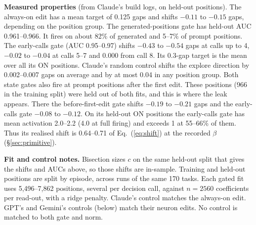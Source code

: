 \textbf{Measured properties} (from Claude's build logs, on held-out positions). The always-on edit has a mean target of 0.125 gaps and shifts $-0.11$ to $-0.15$ gaps, depending on the position group. The generated-positions gate has held-out AUC 0.961--0.966. It fires on about 82\% of generated and 5--7\% of prompt positions. The early-calls gate (AUC 0.95--0.97) shifts $-0.43$ to $-0.54$ gaps at calls up to 4, $-0.02$ to $-0.04$ at calls 5--7 and 0.000 from call 8. Its 0.3-gap target is the mean over all its ON positions. Claude's random control shifts the explore direction by 0.002--0.007 gaps on average and by at most 0.04 in any position group. Both state gates also fire at prompt positions after the first edit. These positions (966 in the training split) were held out of both fits, and this is where the leak appears. There the before-first-edit gate shifts $-0.19$ to $-0.21$ gaps and the early-calls gate $-0.08$ to $-0.12$. On its held-out ON positions the early-calls gate has mean activation 2.0--2.2 (4.0 at full firing) and exceeds 1 at 55--66\% of them. Thus its realised shift is 0.64--0.71 of Eq.~(\ref{eq:shift}) at the recorded $\beta$ (\S\ref{sec:primitive}).

\textbf{Fit and control notes.} Bisection sizes $c$ on the same held-out split that gives the shifts and AUCs above, so those shifts are in-sample. Training and held-out positions are split by episode, across runs of the same 170 tasks. Each gated fit uses 5,496--7,862 positions, several per decision call, against $n = 2560$ coefficients per read-out, with a ridge penalty. Claude's control matches the always-on edit. GPT's and Gemini's controls (below) match their neuron edits. No control is matched to both gate and norm.

